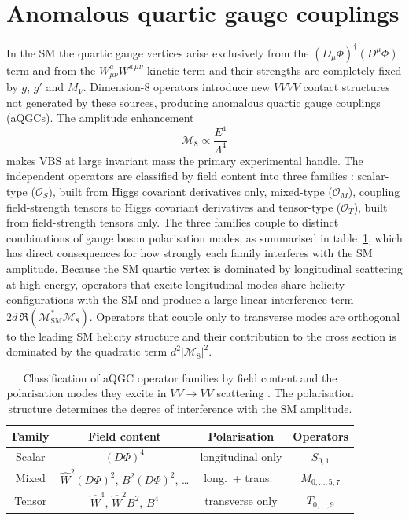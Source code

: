 \section{Anomalous quartic gauge couplings}

In the SM the quartic gauge vertices arise exclusively from the $(D_\mu\Phi)^\dagger(D^\mu\Phi)$ term and from the $W_{\mu\nu}^aW^{a\,\mu\nu}$ kinetic term and their strengths are completely fixed by $g$, $g'$ and $M_V$. Dimension-8 operators introduce new $VVVV$ contact structures not generated by these sources, producing anomalous quartic gauge couplings (aQGCs). The amplitude enhancement
\begin{equation}
\mathcal{M}_{8}\propto \frac{E^{4}}{\Lambda^{4}}
\end{equation}
makes VBS at large invariant mass the primary experimental handle. The independent operators are classified by field content into three families \cite{Eboli_2016}: scalar-type ($\mathcal{O}_{S}$), built from Higgs covariant derivatives only, mixed-type ($\mathcal{O}_{M}$), coupling field-strength tensors to Higgs covariant derivatives and tensor-type ($\mathcal{O}_{T}$), built from field-strength tensors only. The three families couple to distinct combinations of gauge boson polarisation modes, as summarised in table~\ref{tab:aqgc_families}, which has direct consequences for how strongly each family interferes with the SM amplitude. Because the SM quartic vertex is dominated by longitudinal scattering at high energy, operators that excite longitudinal modes share helicity configurations with the SM and produce a large linear interference term $2d\,\Re(\mathcal{M}_{\mathrm{SM}}^{*}\mathcal{M}_{8})$. Operators that couple only to transverse modes are orthogonal to the leading SM helicity structure and their contribution to the cross section is dominated by the quadratic term $d^{2}|\mathcal{M}_{8}|^{2}$.

\begin{table}[htbp]
  \centering
  \caption{Classification of aQGC operator families by field content and the polarisation modes they excite in $VV\to VV$ scattering \cite{Eboli_2016}. The polarisation structure determines the degree of interference with the SM amplitude.}
  \label{tab:aqgc_families}
  \begin{tabular}{|c|c|c|c|}
    \hline
    \textbf{Family} & \textbf{Field content} & \textbf{Polarisation} & \textbf{Operators} \\
    \hline
    Scalar & $(D\Phi)^4$                                  & longitudinal only & $S_{0,1}$ \\
    Mixed  & $\hat{W}^2(D\Phi)^2$, $B^2(D\Phi)^2$, \ldots  & long.\ + trans.\  & $M_{0,\ldots,5,7}$ \\
    Tensor & $\hat{W}^4$, $\hat{W}^2 B^2$, $B^4$           & transverse only   & $T_{0,\ldots,9}$ \\
    \hline
  \end{tabular}
\end{table}

